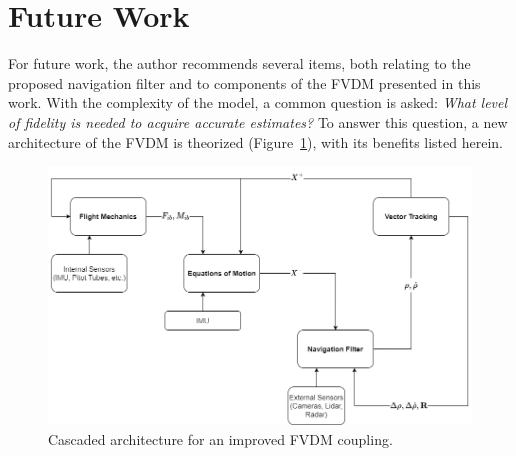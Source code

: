 \section{\textbf{Future Work}}
For future work, the author recommends several items, both relating to the proposed navigation filter and to components of the FVDM presented in this work. With the complexity of the model, a common question is asked: \textit{What level of fidelity is needed to acquire accurate estimates?} To answer this question, a new architecture of the FVDM is theorized (Figure~\ref{fig:futurework}), with its benefits listed herein. 
\begin{figure}[!ht]
    \centering
    \includegraphics[width=\linewidth]{Figures/futurework.drawio.png}
    \caption{Cascaded architecture for an improved FVDM coupling.}\label{fig:futurework}
\end{figure}
